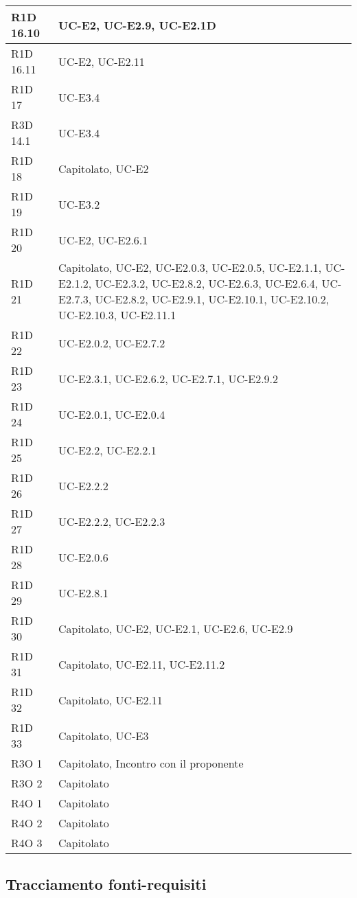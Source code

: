 \begin{center}
\begin{longtable}{ | l | p{8cm} | }
    R1D 16.10 & UC-E2, UC-E2.9, UC-E2.1D \\ \hline
    R1D 16.11 & UC-E2, UC-E2.11 \\ \hline
    R1D 17 &  UC-E3.4  \\ \hline
    R3D 14.1 & UC-E3.4 \\ \hline
    R1D 18 & Capitolato, UC-E2  \\ \hline
    R1D 19 & UC-E3.2 \\ \hline
    R1D 20 & UC-E2, UC-E2.6.1 \\ \hline
    R1D 21 & Capitolato, UC-E2, UC-E2.0.3, UC-E2.0.5, UC-E2.1.1, UC-E2.1.2, UC-E2.3.2, UC-E2.8.2, UC-E2.6.3, UC-E2.6.4, UC-E2.7.3, UC-E2.8.2, UC-E2.9.1, UC-E2.10.1, UC-E2.10.2, UC-E2.10.3, UC-E2.11.1 \\ \hline
    R1D 22 & UC-E2.0.2, UC-E2.7.2 \\ \hline
    R1D 23 & UC-E2.3.1, UC-E2.6.2, UC-E2.7.1, UC-E2.9.2 \\ \hline
    R1D 24 & UC-E2.0.1, UC-E2.0.4 \\ \hline
    R1D 25 & UC-E2.2, UC-E2.2.1 \\ \hline
    R1D 26 & UC-E2.2.2 \\ \hline
    R1D 27 & UC-E2.2.2, UC-E2.2.3  \\ \hline
    R1D 28 & UC-E2.0.6  \\ \hline
    R1D 29 & UC-E2.8.1 \\ \hline
    R1D 30 & Capitolato, UC-E2, UC-E2.1, UC-E2.6, UC-E2.9 \\ \hline
    R1D 31 & Capitolato, UC-E2.11, UC-E2.11.2 \\ \hline
    R1D 32 & Capitolato, UC-E2.11 \\ \hline
    R1D 33 & Capitolato, UC-E3 \\ \hline
    R3O 1 & Capitolato, Incontro con il proponente\\ \hline
    R3O 2 & Capitolato \\ \hline
    R4O 1 & Capitolato \\ \hline
    R4O 2 & Capitolato \\ \hline
    R4O 3 & Capitolato \\ \hline
    \end{longtable}
  \egroup
\end{center} 

\subsection{Tracciamento fonti-requisiti}

